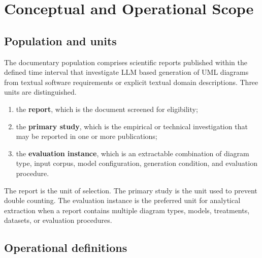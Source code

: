 \section{Conceptual and Operational Scope}
\label{sec:protocol_scope}

\subsection{Population and units}

The documentary population comprises scientific reports published within the defined time interval that investigate LLM based generation of UML diagrams from textual software requirements or explicit textual domain descriptions. Three units are distinguished.

\begin{enumerate}[label=\alph*)]
    \item the \textbf{report}, which is the document screened for eligibility;
    \item the \textbf{primary study}, which is the empirical or technical investigation that may be reported in one or more publications;
    \item the \textbf{evaluation instance}, which is an extractable combination of diagram type, input corpus, model configuration, generation condition, and evaluation procedure.
\end{enumerate}

The report is the unit of selection. The primary study is the unit used to prevent double counting. The evaluation instance is the preferred unit for analytical extraction when a report contains multiple diagram types, models, treatments, datasets, or evaluation procedures.

\subsection{Operational definitions}

